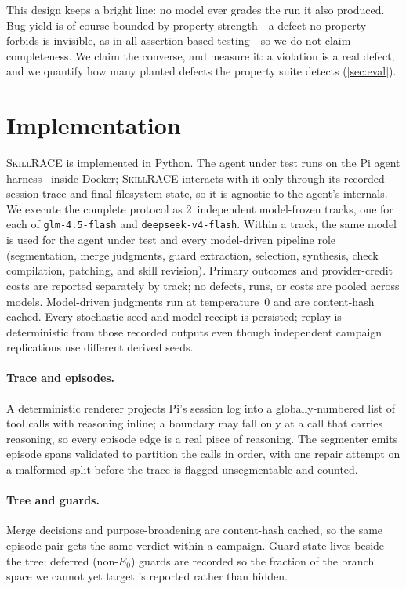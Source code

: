 \documentclass[acmsmall,screen,review,anonymous]{acmart}
\newcommand{\tool}{\textsc{SkillRACE}\xspace}
\newcommand{\Models}{\texttt{glm-4.5-flash} and \texttt{deepseek-v4-flash}}
\newcommand{\NumModelTracks}{2}
\begin{document}
This design keeps a bright line: no model ever grades the run it also produced. Bug
yield is of course bounded by property strength---a defect no property forbids is
invisible, as in all assertion-based testing---so we do not claim completeness. We claim
the converse, and measure it: a violation is a real defect, and we quantify how many
planted defects the property suite detects (\cref{sec:eval}).

\section{Implementation}
\label{sec:impl}

\tool is implemented in Python. The agent under test runs on the Pi agent
harness~\cite{pi2025} inside Docker; \tool interacts with it only through its recorded
session trace and final filesystem state, so it is agnostic to the agent's internals.
We execute the complete protocol as \NumModelTracks\ independent model-frozen tracks,
one for each of \Models. Within a track, the same model is used for the agent under
test and every model-driven pipeline role (segmentation, merge judgments, guard
extraction, selection, synthesis, check compilation, patching, and skill revision).
Primary outcomes and provider-credit costs are reported separately by track; no defects,
runs, or costs are pooled across models. Model-driven
judgments run at temperature~0 and are content-hash cached. Every stochastic seed and
model receipt is persisted; replay is deterministic from those recorded outputs even
though independent campaign replications use different derived seeds.

\paragraph{Trace and episodes.} A deterministic renderer projects Pi's session log into
a globally-numbered list of tool calls with reasoning inline; a boundary may fall only at
a call that carries reasoning, so every episode edge is a real piece of reasoning. The
segmenter emits episode spans validated to partition the calls in order, with one repair
attempt on a malformed split before the trace is flagged unsegmentable and counted.

\paragraph{Tree and guards.} Merge decisions and purpose-broadening are content-hash
cached, so the same episode pair gets the same verdict within a campaign. Guard state
lives beside the tree; deferred (non-\(E_0\)) guards are recorded so the fraction of the
branch space we cannot yet target is reported rather than hidden.
\end{document}
